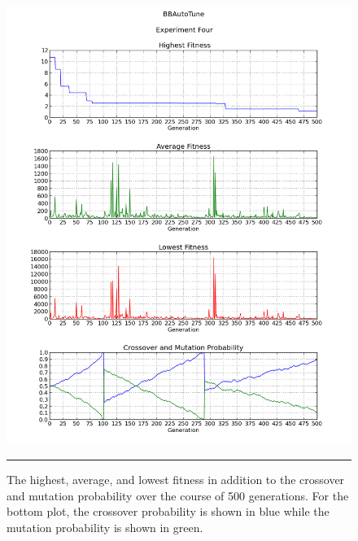 \begin{figure}[htbp]
\centering
\includegraphics[width=5in]{../Figures/Chapter4/exp4_halcm.png}
\rule{35em}{0.5pt}
\caption[Experiment Four GA Metrics]{The highest, average, and lowest fitness in addition to the crossover and mutation probability over the course of 500 generations. For the bottom plot, the crossover probability is shown in blue while the mutation probability is shown in green.}
\label{fig:exp4_halcm}
\end{figure}

